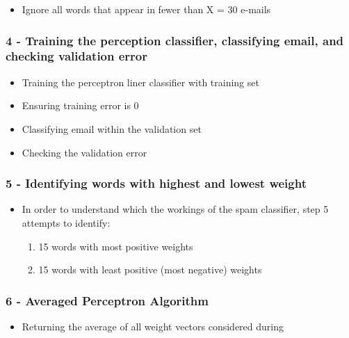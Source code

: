 \documentclass[11pt]{article}
\providecommand{\tightlist}{%
      \setlength{\itemsep}{0pt}\setlength{\parskip}{0pt}}
\begin{document}
\begin{itemize}
\tightlist
\item
  Ignore all words that appear in fewer than X = 30 e-mails
\end{itemize}

\subsubsection{4 - Training the perception classifier, classifying
email, and checking validation
error}\label{training-the-perception-classifier-classifying-email-and-checking-validation-error}

\begin{itemize}
\tightlist
\item
  Training the perceptron liner classifier with training set
\item
  Ensuring training error is 0
\item
  Classifying email within the validation set
\item
  Checking the validation error
\end{itemize}

\subsubsection{5 - Identifying words with highest and lowest
weight}\label{identifying-words-with-highest-and-lowest-weight}

\begin{itemize}
\item
  In order to understand which the workings of the spam classifier, step
  5 attempts to identify:

  \begin{enumerate}
  \def\labelenumi{\alph{enumi})}
  \item
    15 words with most positive weights
  \item
    15 words with least positive (most negative) weights
  \end{enumerate}
\end{itemize}

\subsubsection{6 - Averaged Perceptron
Algorithm}\label{averaged-perceptron-algorithm}

\begin{itemize}
\tightlist
\item
  Returning the average of all weight vectors considered during
\end{itemize}
\end{document}

